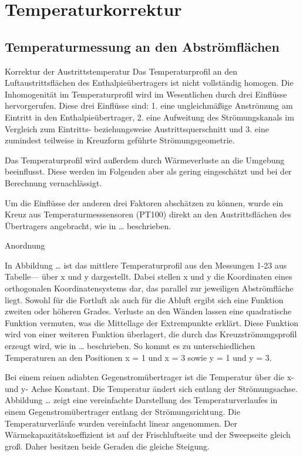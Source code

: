 \chapter{Temperaturkorrektur}
\label{cha:Hauptteil}

\section{Temperaturmessung an den Abströmflächen}
\label{sec:Temperaturmessung an den Abströmflächen}

Korrektur der Austrittstemperatur
Das Temperaturprofil an den Luftaustrittsflächen des Enthalpieübertragers ist nicht vollständig homogen. Die Inhomogenität im Temperaturprofil wird im Wesentlichen durch drei Einflüsse hervorgerufen. Diese drei Einflüsse sind:
1. eine ungleichmäßige Anströmung am Eintritt in den Enthalpieübertrager, 
2. eine Aufweitung des Strömungskanals im Vergleich zum Eintritts- beziehungsweise Austrittsquerschnitt und 
3. eine zumindest teilweise in Kreuzform geführte Strömungsgeometrie. 

Das Temperaturprofil wird außerdem durch Wärmeverluste an die Umgebung beeinflusst. Diese werden im Folgenden aber als gering eingeschätzt und bei der Berechnung vernachlässigt.

Um die Einflüsse der anderen drei Faktoren abschätzen zu können, wurde ein Kreuz aus Temperaturmesssensoren (PT100) direkt an den Austrittsflächen des Übertragers angebracht, wie in … beschrieben. 

Anordnung


In Abbildung … ist das mittlere Temperaturprofil aus den Messungen 1-23 aus Tabelle--- über x und y dargestellt. Dabei stellen x und y die Koordinaten eines orthogonalen Koordinatensystems dar, das parallel zur jeweiligen Abströmfläche liegt. Sowohl für die Fortluft als auch für die Abluft ergibt sich eine Funktion zweiten oder höheren Grades. Verluste an den Wänden lassen eine quadratische Funktion vermuten, was die Mittellage der Extrempunkte erklärt. Diese Funktion wird von einer weiteren Funktion überlagert, die durch das Kreuzströmungsprofil erzeugt wird, wie in … beschrieben. So kommt es zu unterschiedlichen Temperaturen an den Positionen x = 1 und x = 3 sowie y = 1 und y = 3.


Bei einem reinen adiabten Gegenstromübertrager ist die Temperatur über die x- und y- Achse Konstant. Die Temperatur ändert sich entlang der Strömungsachse. Abbildung … zeigt eine vereinfachte Darstellung des Temperaturverlaufes in einem Gegenstromübertrager entlang der Strömungsrichtung. Die Temperaturverläufe wurden vereinfacht linear angenommen. Der Wärmekapazitätskoeffizient ist auf der Frischluftseite und der Sweepseite gleich groß. Daher besitzen beide Geraden die gleiche Steigung.

